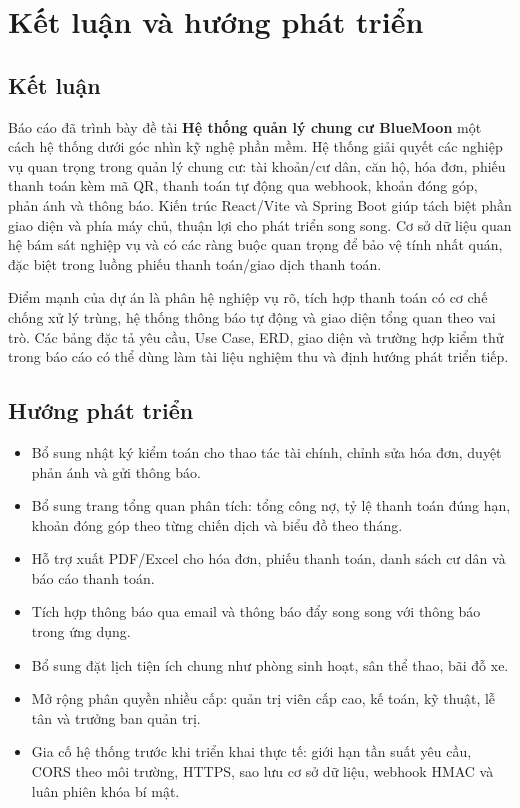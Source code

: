 ﻿\documentclass[12pt,a4paper]{report}
\newcommand{\topic}{Hệ thống quản lý chung cư BlueMoon}
\begin{document}
\chapter{Kết luận và hướng phát triển}

\section{Kết luận}
Báo cáo đã trình bày đề tài \textbf{\topic} một cách hệ thống dưới góc nhìn kỹ nghệ phần mềm. Hệ thống giải quyết các nghiệp vụ quan trọng trong quản lý chung cư: tài khoản/cư dân, căn hộ, hóa đơn, phiếu thanh toán kèm mã QR, thanh toán tự động qua webhook, khoản đóng góp, phản ánh và thông báo. Kiến trúc React/Vite và Spring Boot giúp tách biệt phần giao diện và phía máy chủ, thuận lợi cho phát triển song song. Cơ sở dữ liệu quan hệ bám sát nghiệp vụ và có các ràng buộc quan trọng để bảo vệ tính nhất quán, đặc biệt trong luồng phiếu thanh toán/giao dịch thanh toán.

Điểm mạnh của dự án là phân hệ nghiệp vụ rõ, tích hợp thanh toán có cơ chế chống xử lý trùng, hệ thống thông báo tự động và giao diện tổng quan theo vai trò. Các bảng đặc tả yêu cầu, Use Case, ERD, giao diện và trường hợp kiểm thử trong báo cáo có thể dùng làm tài liệu nghiệm thu và định hướng phát triển tiếp.

\section{Hướng phát triển}
\begin{itemize}
  \item Bổ sung nhật ký kiểm toán cho thao tác tài chính, chỉnh sửa hóa đơn, duyệt phản ánh và gửi thông báo.
  \item Bổ sung trang tổng quan phân tích: tổng công nợ, tỷ lệ thanh toán đúng hạn, khoản đóng góp theo từng chiến dịch và biểu đồ theo tháng.
  \item Hỗ trợ xuất PDF/Excel cho hóa đơn, phiếu thanh toán, danh sách cư dân và báo cáo thanh toán.
  \item Tích hợp thông báo qua email và thông báo đẩy song song với thông báo trong ứng dụng.
  \item Bổ sung đặt lịch tiện ích chung như phòng sinh hoạt, sân thể thao, bãi đỗ xe.
  \item Mở rộng phân quyền nhiều cấp: quản trị viên cấp cao, kế toán, kỹ thuật, lễ tân và trưởng ban quản trị.
  \item Gia cố hệ thống trước khi triển khai thực tế: giới hạn tần suất yêu cầu, CORS theo môi trường, HTTPS, sao lưu cơ sở dữ liệu, webhook HMAC và luân phiên khóa bí mật.
\end{itemize}
\end{document}
